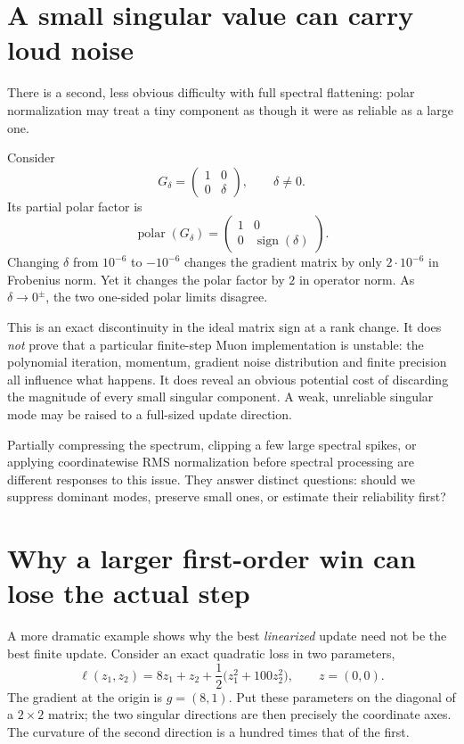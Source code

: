 \section{A small singular value can carry loud noise}

There is a second, less obvious difficulty with full spectral flattening: polar normalization may treat a tiny component as though it were as reliable as a large one.

Consider
\[
 G_\delta=\begin{pmatrix}1&0\\0&\delta\end{pmatrix},
 \qquad \delta\ne0.
\]
Its partial polar factor is
\[
 \operatorname{polar}(G_\delta)
 =\begin{pmatrix}1&0\\0&\operatorname{sign}(\delta)\end{pmatrix}.
\]
Changing \(\delta\) from \(10^{-6}\) to \(-10^{-6}\) changes the gradient matrix by only \(2\cdot10^{-6}\) in Frobenius norm.  Yet it changes the polar factor by \(2\) in operator norm.  As \(\delta\to0^\pm\), the two one-sided polar limits disagree.

This is an exact discontinuity in the ideal matrix sign at a rank change.  It does \emph{not} prove that a particular finite-step Muon implementation is unstable: the polynomial iteration, momentum, gradient noise distribution and finite precision all influence what happens.  It does reveal an obvious potential cost of discarding the magnitude of every small singular component.  A weak, unreliable singular mode may be raised to a full-sized update direction.

Partially compressing the spectrum, clipping a few large spectral spikes, or applying coordinatewise RMS normalization before spectral processing are different responses to this issue.  They answer distinct questions: should we suppress dominant modes, preserve small ones, or estimate their reliability first?

\section{Why a larger first-order win can lose the actual step}

A more dramatic example shows why the best \emph{linearized} update need not be the best finite update.  Consider an exact quadratic loss in two parameters,
\[
 \ell(z_1,z_2)
 =8z_1+z_2+\frac12\bigl(z_1^2+100z_2^2\bigr),
 \qquad z=(0,0).
\]
The gradient at the origin is \(g=(8,1)\).  Put these parameters on the diagonal of a \(2\times2\) matrix; the two singular directions are then precisely the coordinate axes.  The curvature of the second direction is a hundred times that of the first.

